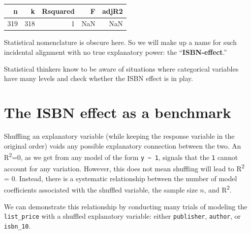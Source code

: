 \documentclass[
  letterpaper,
  DIV=11,
  numbers=noendperiod,
  oneside]{scrreprt}
\begin{document}
\ttfamily 
\begin{tabular}{rrrrr}
\toprule
n & k & Rsquared & F & adjR2\\
\midrule
319 & 318 & 1 & NaN & NaN\\
\bottomrule
\end{tabular} \normalfont
\bigskip

Statistical nomenclature is obscure here. So we will make up a name for
such incidental alignment with no true explanatory power: the
``\textbf{ISBN-effect}.''

Statistical thinkers know to be aware of situations where categorical
variables have many levels and check whether the ISBN effect is in play.

\hypertarget{the-isbn-effect-as-a-benchmark}{%
\section{The ISBN effect as a
benchmark}\label{the-isbn-effect-as-a-benchmark}}

Shuffling an explanatory variable (while keeping the response variable
in the original order) voids any possible explanatory connection between
the two. An R\textsuperscript{2}=0, as we get from any model of the form
\texttt{y\ \textasciitilde{}\ 1}, signals that the \texttt{1} cannot
account for any variation. However, this does not mean shuffling will
lead to R\textsuperscript{2} = 0. Instead, there is a systematic
relationship between the number of model coefficients associated with
the shuffled variable, the sample size \(n\), and R\textsuperscript{2}.

We can demonstrate this relationship by conducting many trials of
modeling the \texttt{list\_price} with a shuffled explanatory variable:
either \texttt{publisher}, \texttt{author}, or \texttt{isbn\_10}.
\end{document}
